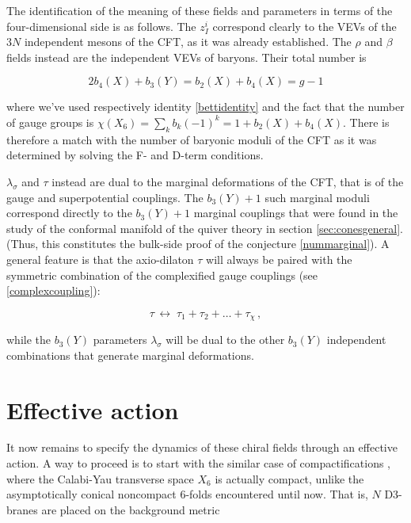 The identification of the meaning of these fields and parameters in terms of the four-dimensional side is as follows. The $z_I^i$ correspond clearly to the VEVs of the $3N$ independent mesons of the CFT, as it was already established. The $\rho$ and $\beta$ fields instead are the independent VEVs of baryons. Their total number is

\begin{equation}
	2 b_4(X) + b_3(Y) = b_2(X) + b_4(X) = g - 1
	\label{}
\end{equation}

where we've used respectively identity \eqref{bettidentity} and the fact that the number of gauge groups is $\chi(X_6) = \sum_k b_k (-1)^k = 1 + b_2(X) + b_4(X) $. There is therefore a match with the number of baryonic moduli of the CFT as it was determined by solving the F- and D-term conditions.

$\lambda_\sigma$ and $\tau$ instead are dual to the marginal deformations of the CFT, that is of the gauge and superpotential couplings. The $b_3(Y) + 1$ such marginal moduli correspond directly to the $b_3(Y) + 1$ marginal couplings that were found in the study of the conformal manifold of the quiver theory in section \ref{sec:conesgeneral}. (Thus, this constitutes the bulk-side proof of the conjecture \eqref{nummarginal}). A general feature is that the axio-dilaton $\tau$ will always be paired with the symmetric combination of the complexified gauge couplings (see \eqref{complexcoupling}):

\begin{equation}
	\tau \, \longleftrightarrow\; \tau_1 + \tau_2 + \ldots + \tau_\chi\,,
	\label{}
\end{equation}

while the $b_3(Y)$ parameters $\lambda_\sigma$ will be dual to the other $b_3(Y)$ independent combinations that generate marginal deformations.

\section{Effective action}\label{sec:heftlagrangian}

It now remains to specify the dynamics of these chiral fields through an effective action. A way to proceed is to start with the similar case of compactifications \cite{MZ_2}, where the Calabi-Yau transverse space $X_6$ is actually compact, unlike the asymptotically conical noncompact 6-folds encountered until now. That is, $N$ D3-branes are placed on the background metric

